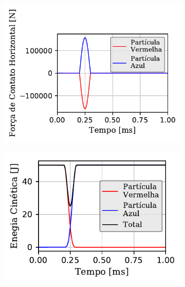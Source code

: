\begin{figure}[htb!]
{\begin{subfigure}[t]{\smallresultsfigwidth}
			\includegraphics[scale=1]{images/colliding_spheres/conservative/contactForce-X_small.pdf}
			\caption{}
			\label{subfig:colliding_spheres:conservative:x_contact_force}
		\end{subfigure}
		\begin{subfigure}[t]{\smallresultsfigwidth}
			\centering
			\includegraphics[scale=1]{images/colliding_spheres/conservative/kineticEnergy_small_total.pdf}
			\caption{}
			\label{subfig:colliding_spheres:conservative:kinetic_energy}
		\end{subfigure}
		\begin{subfigure}[t]{\smallresultsfigwidth}
			\centering

\end{subfigure}}
\end{figure}
